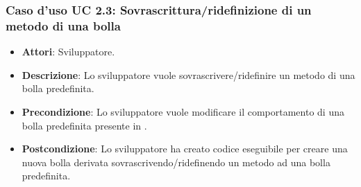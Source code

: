 \subsubsection{Caso d'uso UC 2.3: Sovrascrittura/ridefinizione di un metodo di una bolla}

\FloatBarrier
\begin{itemize}
\item\textbf{Attori}: Sviluppatore.
\item\textbf{Descrizione}: Lo sviluppatore vuole sovrascrivere/ridefinire un metodo di una bolla predefinita.
\item\textbf{Precondizione}: Lo sviluppatore vuole modificare il comportamento di una bolla predefinita presente in \progetto.
\item\textbf{Postcondizione}: Lo sviluppatore ha creato codice eseguibile per creare una nuova bolla derivata sovrascrivendo/ridefinendo un metodo ad una bolla predefinita.
\end{itemize}
